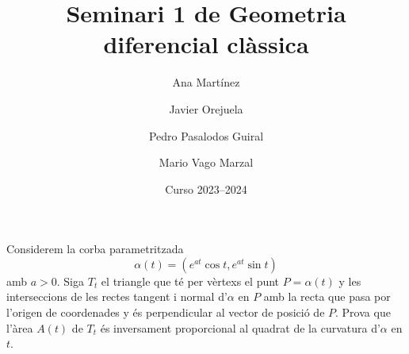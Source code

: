 \documentclass[a4paper, 11pt]{article}
\title{Seminari 1 de Geometria diferencial clàssica}
\author{Ana Martínez \and Javier Orejuela \and%
  Pedro Pasalodos Guiral \and Mario Vago Marzal}
\date{Curso 2023--2024}
\begin{document}
  \maketitle

  \begin{exercise}
    Considerem la corba parametritzada
    \[
      \alpha(t) = (e^{at} \cos t, e^{at} \sin t)
    \]
    amb $a > 0$. Siga $T_t$ el triangle que té per vèrtexs el punt $P =
    \alpha(t)$ y les interseccions de les rectes tangent i normal
    d'$\alpha$ en $P$ amb la recta que pasa por l'origen de coordenades y
    és perpendicular al vector de posició de $P$. Prova que l'àrea $A(t)$
    de $T_t$ és inversament proporcional al quadrat de la curvatura
    d'$\alpha$ en $t$.
  \end{exercise}
\end{document}
